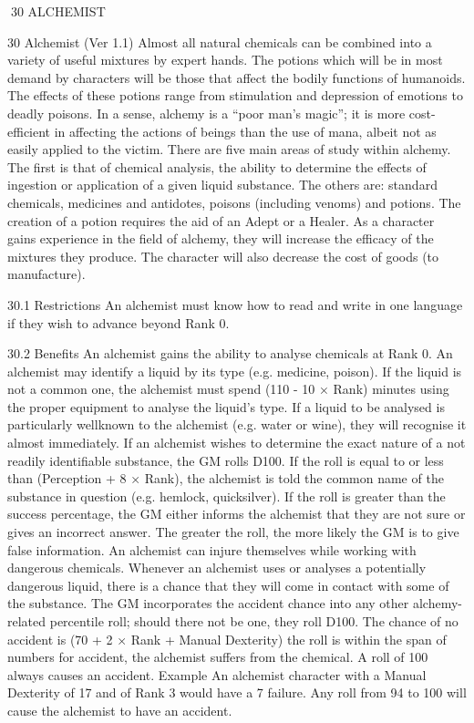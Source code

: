 \documentclass[a4paper]{article}
\begin{document}
\begin{multicols}{3}
30 ALCHEMIST

30 Alchemist (Ver 1.1)
Almost all natural chemicals can be combined into
a variety of useful mixtures by expert hands. The
potions which will be in most demand by characters will be those that affect the bodily functions of
humanoids. The effects of these potions range from
stimulation and depression of emotions to deadly
poisons. In a sense, alchemy is a “poor man’s
magic”; it is more cost-efficient in affecting the
actions of beings than the use of mana, albeit not as
easily applied to the victim.
There are five main areas of study within alchemy.
The first is that of chemical analysis, the ability to
determine the effects of ingestion or application of
a given liquid substance. The others are: standard
chemicals, medicines and antidotes, poisons (including venoms) and potions. The creation of a
potion requires the aid of an Adept or a Healer.
As a character gains experience in the field of
alchemy, they will increase the efficacy of the
mixtures they produce. The character will also
decrease the cost of goods (to manufacture).

30.1 Restrictions
An alchemist must know how to read and write in
one language if they wish to advance beyond Rank
0.

30.2 Benefits
An alchemist gains the ability to analyse chemicals at Rank 0.
An alchemist may identify a liquid by its type (e.g.
medicine, poison). If the liquid is not a common
one, the alchemist must spend (110 - 10 × Rank)
minutes using the proper equipment to analyse the
liquid’s type.
If a liquid to be analysed is particularly wellknown to the alchemist (e.g. water or wine), they
will recognise it almost immediately. If an alchemist wishes to determine the exact nature of a not
readily identifiable substance, the GM rolls D100.
If the roll is equal to or less than (Perception + 8 ×
Rank), the alchemist is told the common name of
the substance in question (e.g. hemlock, quicksilver). If the roll is greater than the success percentage, the GM either informs the alchemist that they
are not sure or gives an incorrect answer. The
greater the roll, the more likely the GM is to give
false information.
An alchemist can injure themselves while working with dangerous chemicals.
Whenever an alchemist uses or analyses a potentially dangerous liquid, there is a chance that they
will come in contact with some of the substance.
The GM incorporates the accident chance into any
other alchemy-related percentile roll; should there
not be one, they roll D100. The chance of no accident is (70 + 2 × Rank + Manual Dexterity)%
the roll is within the span of numbers for accident,
the alchemist suffers from the chemical. A roll of
100 always causes an accident.
Example
An alchemist character with a Manual
Dexterity of 17 and of Rank 3 would have a 7%
failure. Any roll from 94 to 100 will cause the alchemist to
have an accident.


\end{multicols}
\end{document}

